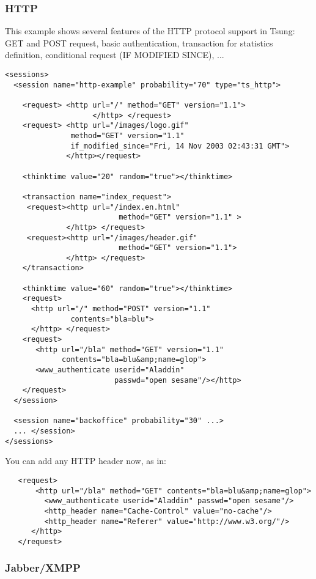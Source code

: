 \documentclass{IDXDOC-en}
\begin{document}
\subsubsection{HTTP}


This example shows several features of the HTTP protocol support in
Tsung: GET and POST request, basic authentication, transaction for
statistics definition, conditional request (IF MODIFIED SINCE), ...


\begin{Verbatim}
<sessions>
  <session name="http-example" probability="70" type="ts_http">

    <request> <http url="/" method="GET" version="1.1">
                    </http> </request>
    <request> <http url="/images/logo.gif"
               method="GET" version="1.1"
               if_modified_since="Fri, 14 Nov 2003 02:43:31 GMT">
              </http></request>

    <thinktime value="20" random="true"></thinktime>

    <transaction name="index_request">
     <request><http url="/index.en.html"
                          method="GET" version="1.1" >
              </http> </request>
     <request><http url="/images/header.gif"
                          method="GET" version="1.1">
              </http> </request>
    </transaction>

    <thinktime value="60" random="true"></thinktime>
    <request>
      <http url="/" method="POST" version="1.1"
               contents="bla=blu">
      </http> </request>
    <request>
       <http url="/bla" method="GET" version="1.1"
             contents="bla=blu&amp;name=glop">
       <www_authenticate userid="Aladdin"
                         passwd="open sesame"/></http>
    </request>
  </session>

  <session name="backoffice" probability="30" ...>
  ... </session>
</sessions>
\end{Verbatim}

 You can add any HTTP header now, as in:
\begin{Verbatim}
   <request>
       <http url="/bla" method="GET" contents="bla=blu&amp;name=glop">
         <www_authenticate userid="Aladdin" passwd="open sesame"/>
         <http_header name="Cache-Control" value="no-cache"/>
         <http_header name="Referer" value="http://www.w3.org/"/>
      </http>
   </request>
\end{Verbatim}

\subsubsection{Jabber/XMPP}
\end{document}
